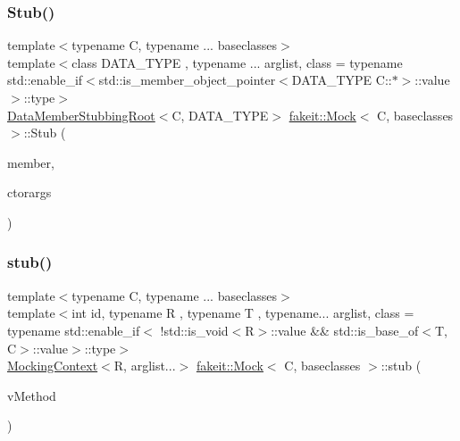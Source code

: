 \mbox{\label{classfakeit_1_1Mock_ae210824251ca071933f8a651bbe56047}} 
\subsubsection{\texorpdfstring{Stub()}{Stub()}\hspace{0.1cm}{\footnotesize\ttfamily [7/9]}}
{\footnotesize\ttfamily template$<$typename C, typename ... baseclasses$>$ \\
template$<$class D\+A\+T\+A\+\_\+\+T\+Y\+PE , typename ... arglist, class  = typename std\+::enable\+\_\+if$<$std\+::is\+\_\+member\+\_\+object\+\_\+pointer$<$\+D\+A\+T\+A\+\_\+\+T\+Y\+P\+E C\+::$\ast$$>$\+::value$>$\+::type$>$ \\
\mbox{\hyperlink{classfakeit_1_1DataMemberStubbingRoot}{Data\+Member\+Stubbing\+Root}}$<$C, D\+A\+T\+A\+\_\+\+T\+Y\+PE$>$ \mbox{\hyperlink{classfakeit_1_1Mock}{fakeit\+::\+Mock}}$<$ C, baseclasses $>$\+::Stub (\begin{DoxyParamCaption}\item[{D\+A\+T\+A\+\_\+\+T\+Y\+PE C\+::$\ast$}]{member,  }\item[{const arglist \&...}]{ctorargs }\end{DoxyParamCaption})\hspace{0.3cm}{\ttfamily [inline]}}

\mbox{\label{classfakeit_1_1Mock_a6974858200b57469de78bf2a06d6fa02}} 
\subsubsection{\texorpdfstring{stub()}{stub()}\hspace{0.1cm}{\footnotesize\ttfamily [23/72]}}
{\footnotesize\ttfamily template$<$typename C, typename ... baseclasses$>$ \\
template$<$int id, typename R , typename T , typename... arglist, class  = typename std\+::enable\+\_\+if$<$                !std\+::is\+\_\+void$<$\+R$>$\+::value \&\& std\+::is\+\_\+base\+\_\+of$<$\+T, C$>$\+::value$>$\+::type$>$ \\
\mbox{\hyperlink{classfakeit_1_1MockingContext}{Mocking\+Context}}$<$R, arglist...$>$ \mbox{\hyperlink{classfakeit_1_1Mock}{fakeit\+::\+Mock}}$<$ C, baseclasses $>$\+::stub (\begin{DoxyParamCaption}\item[{R(T\+::$\ast$)(arglist...) volatile}]{v\+Method }\end{DoxyParamCaption})\hspace{0.3cm}{\ttfamily [inline]}}

